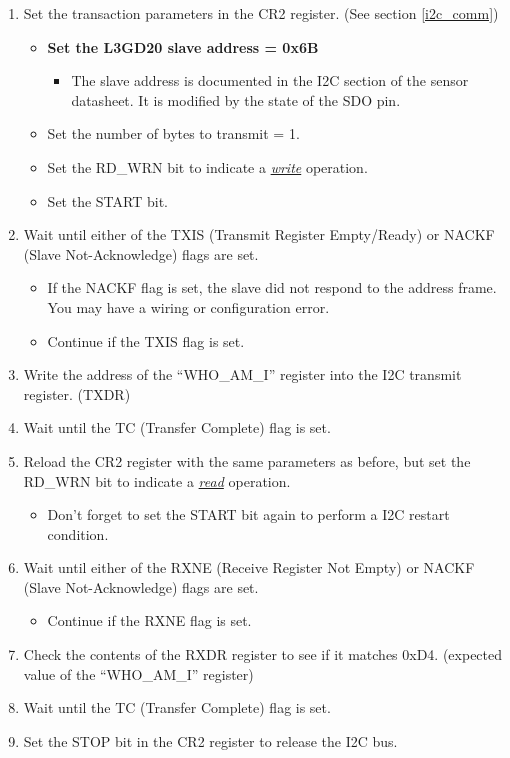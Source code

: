 \documentclass[11pt,fleqn]{book} %
\begin{document}
\begin{enumerate}
    \item Set the transaction parameters in the CR2 register. (See section \ref{i2c_comm})
    \begin{itemize}
        \item \textbf{Set the L3GD20 slave address = 0x6B}
        \begin{itemize}
            \item The slave address is documented in the I2C section of the sensor datasheet. It is modified by the state of the SDO pin.
        \end{itemize}
        \item Set the number of bytes to transmit = 1.
        \item Set the RD\_WRN bit to indicate a \underline{\textit{write}} operation.
        \item Set the START bit.
    \end{itemize}
    \item Wait until either of the TXIS (Transmit Register Empty/Ready) or NACKF (Slave Not-Acknowledge) flags are set.
    \begin{itemize}
        \item If the NACKF flag is set, the slave did not respond to the address frame. You may have a wiring or configuration error. 
        \item Continue if the TXIS flag is set. 
    \end{itemize}
    \item Write the address of the ``WHO\_AM\_I'' register into the I2C transmit register. (TXDR)
    \item Wait until the TC (Transfer Complete) flag is set.
    \item Reload the CR2 register with the same parameters as before, but set the RD\_WRN bit to indicate a \underline{\textit{read}} operation.
    \begin{itemize}
        \item Don't forget to set the START bit again to perform a I2C restart condition.
    \end{itemize}
    \item Wait until either of the RXNE (Receive Register Not Empty) or NACKF (Slave Not-Acknowledge) flags are set.
    \begin{itemize}
        \item Continue if the RXNE flag is set. 
    \end{itemize}
    \item Check the contents of the RXDR register to see if it matches 0xD4. (expected value of the ``WHO\_AM\_I'' register) 
    \item Wait until the TC (Transfer Complete) flag is set.
    \item Set the STOP bit in the CR2 register to release the I2C bus.
\end{enumerate}
\end{document}
